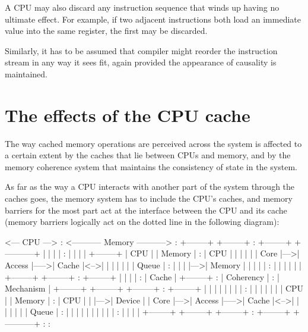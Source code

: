 A CPU may also discard any instruction sequence that winds up having no
ultimate effect.
For example, if two adjacent instructions both load an immediate value
into the same register, the first may be discarded.


Similarly, it has to be assumed that compiler might reorder the instruction
stream in any way it sees fit, again provided the appearance of causality is
maintained.


\section{The effects of the CPU cache}

The way cached memory operations are perceived across the system is affected to
a certain extent by the caches that lie between CPUs and memory, and by the
memory coherence system that maintains the consistency of state in the system.

As far as the way a CPU interacts with another part of the system through the
caches goes, the memory system has to include the CPU's caches, and memory
barriers for the most part act at the interface between the CPU and its cache
(memory barriers logically act on the dotted line in the following diagram):

\begin{VerbatimU}[tabsize=1]
	    <--- CPU --->         :       <----------- Memory ----------->
	                          :
	+--------+    +--------+  :   +--------+    +-----------+
	|        |    |        |  :   |        |    |           |    +--------+
	|  CPU   |    | Memory |  :   | CPU    |    |           |    |        |
	|  Core  |--->| Access |----->| Cache  |<-->|           |    |        |
	|        |    | Queue  |  :   |        |    |           |--->| Memory |
	|        |    |        |  :   |        |    |           |    |        |
	+--------+    +--------+  :   +--------+    |           |    |        |
	                          :                 | Cache     |    +--------+
	                          :                 | Coherency |
	                          :                 | Mechanism |    +--------+
	+--------+    +--------+  :   +--------+    |           |    |        |
	|        |    |        |  :   |        |    |           |    |        |
	|  CPU   |    | Memory |  :   | CPU    |    |           |--->| Device |
	|  Core  |--->| Access |----->| Cache  |<-->|           |    |        |
	|        |    | Queue  |  :   |        |    |           |    |        |
	|        |    |        |  :   |        |    |           |    +--------+
	+--------+    +--------+  :   +--------+    +-----------+
	                          :
	                          :
\end{VerbatimU}

